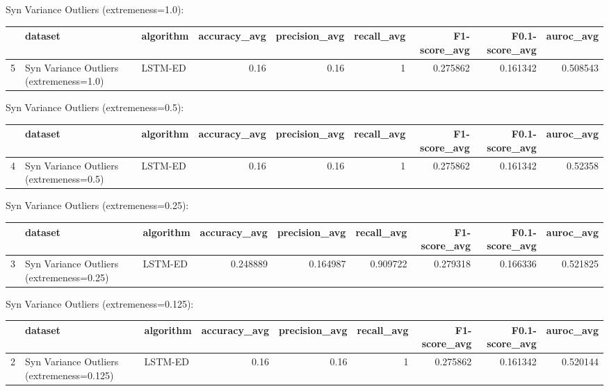 Syn Variance Outliers (extremeness=1.0):

\begin{tabular}{rllrrrrrr}
\hline
    & dataset                                 & algorithm   &   accuracy\_avg &   precision\_avg &   recall\_avg &   F1-score\_avg &   F0.1-score\_avg &   auroc\_avg \\
\hline
  5 & Syn Variance Outliers (extremeness=1.0) & LSTM-ED     &           0.16 &            0.16 &            1 &       0.275862 &         0.161342 &    0.508543 \\
\hline
\end{tabular}

Syn Variance Outliers (extremeness=0.5):

\begin{tabular}{rllrrrrrr}
\hline
    & dataset                                 & algorithm   &   accuracy\_avg &   precision\_avg &   recall\_avg &   F1-score\_avg &   F0.1-score\_avg &   auroc\_avg \\
\hline
  4 & Syn Variance Outliers (extremeness=0.5) & LSTM-ED     &           0.16 &            0.16 &            1 &       0.275862 &         0.161342 &     0.52358 \\
\hline
\end{tabular}

Syn Variance Outliers (extremeness=0.25):

\begin{tabular}{rllrrrrrr}
\hline
    & dataset                                  & algorithm   &   accuracy\_avg &   precision\_avg &   recall\_avg &   F1-score\_avg &   F0.1-score\_avg &   auroc\_avg \\
\hline
  3 & Syn Variance Outliers (extremeness=0.25) & LSTM-ED     &       0.248889 &        0.164987 &     0.909722 &       0.279318 &         0.166336 &    0.521825 \\
\hline
\end{tabular}

Syn Variance Outliers (extremeness=0.125):

\begin{tabular}{rllrrrrrr}
\hline
    & dataset                                   & algorithm   &   accuracy\_avg &   precision\_avg &   recall\_avg &   F1-score\_avg &   F0.1-score\_avg &   auroc\_avg \\
\hline
  2 & Syn Variance Outliers (extremeness=0.125) & LSTM-ED     &           0.16 &            0.16 &            1 &       0.275862 &         0.161342 &    0.520144 \\
\hline
\end{tabular}

